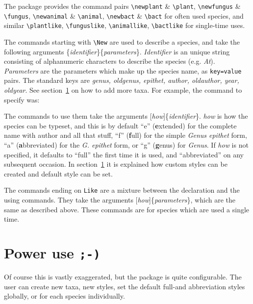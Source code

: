 \documentclass{article}
\makeatletter
\newenvironment{breakverbatim}{\def\@xobeysp{\ }\verbatim}{\endverbatim}
\makeatother
\begin{document}
The package provides the command pairs \verb!\newplant! \& \verb!\plant!, \verb!\newfungus! \& \verb!\fungus!, \verb!\newanimal! \& \verb!\animal!, \verb!\newbact! \& \verb!\bact! for often used species, and similar \verb!\plantlike!, \verb!\funguslike!, \verb!\animallike!, \verb!\bactlike! for single-time uses.

The commands starting with \verb!\New! are used to describe a species, and take the following arguments \{\textit{identifier}\}\{\textit{parameters}\}. \textit{Identifier} is an unique string consisting of alphanumeric characters to describe the species (e.g. \textit{At}). \textit{Parameters} are the parameters which make up the species name, as \texttt{key=value} pairs. The standard keys are \textit{genus, oldgenus, epithet, author, oldauthor, year, oldyear}. See section~\ref{sec:Power use} on how to add more taxa. For example, the command to specify  was:\begin{breakverbatim}\end{breakverbatim}

The commands to use them take the arguments [\textit{how}]\{\textit{identifier}\}. \textit{how} is how the species can be typeset, and this is by default ``e'' (\textbf{e}xtended) for the complete name with author and all that stuff, ``f'' (\textbf{f}ull) for the simple \textit{Genus epithet} form, ``a'' (\textbf{a}bbreviated) for the \textit{G. epithet} form, or ``g'' (\textbf{g}enus) for \textit{Genus}. If \textit{how} is not specified, it defaults to ``full'' the first time it is used, and ``abbreviated'' on any subsequent occasion. In section~\ref{sec:Power use} it is explained how custom styles can be created and default style can be set.

The commands ending on \verb!Like! are a mixture between the declaration and the using commands. They take the arguments [\textit{how}]\{\textit{parameters}\}, which are the same as described above. These commands are for species which are used a single time.

\section{Power use \texttt{;-)}}\label{sec:Power use}
Of course this is vastly exaggerated, but the package is quite configurable. The user can create new taxa, new styles, set the default full-and abbreviation styles globally, or for each species individually.
\end{document}
